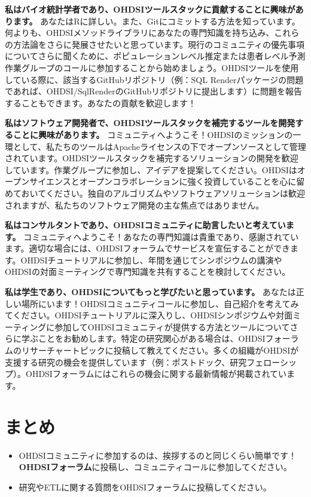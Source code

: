 \documentclass[
  11pt]{book}
\makeatletter
\providecommand{\tightlist}{%
  \setlength{\itemsep}{0pt}\setlength{\parskip}{0pt}}
\newenvironment{kframe}{%
\medskip{}
\setlength{\fboxsep}{.8em}
 \def\at@end@of@kframe{}%
 \ifinner\ifhmode%
  \def\at@end@of@kframe{\end{minipage}}%
  \begin{minipage}{\columnwidth}%
 \fi\fi%
 \def\FrameCommand##1{\hskip\@totalleftmargin \hskip-\fboxsep
 \colorbox{myShadeColor}{##1}\hskip-\fboxsep
     \hskip-\linewidth \hskip-\@totalleftmargin \hskip\columnwidth}%
 \MakeFramed {\advance\hsize-\width
   \@totalleftmargin\z@ \linewidth\hsize
   \@setminipage}}%
 {\par\unskip\endMakeFramed%
 \at@end@of@kframe}
\newenvironment{rmdblock}[1]
  {
  \begin{itemize}
  \renewcommand{\labelitemi}{
    \raisebox{-.7\height}[0pt][0pt]{
      {\setkeys{Gin}{width=3em,keepaspectratio}\texttt{[image: images/\#1]}}
    }
  }
  \setlength{\fboxsep}{1em}
  \begin{kframe}
  \item
  }
  {
  \end{kframe}
  \end{itemize}
  }
\newenvironment{rmdsummary}
  {\begin{rmdblock}{summary}}
  {\end{rmdblock}}
\theoremstyle{definition}
\theoremstyle{definition}
\theoremstyle{definition}
\theoremstyle{definition}
\theoremstyle{remark}
\makeatother
\begin{document}
\textbf{私はバイオ統計学者であり、OHDSIツールスタックに貢献することに興味があります。} あなたはRに詳しい。また、Gitにコミットする方法を知っています。何よりも、OHDSIメソッドライブラリにあなたの専門知識を持ち込み、これらの方法論をさらに発展させたいと思っています。現行のコミュニティの優先事項についてさらに聞くために、ポピュレーションレベル推定または患者レベル予測作業グループのコールに参加することから始めましょう。OHDSIツールを使用している際に、該当するGitHubリポジトリ（例：SQL Renderパッケージの問題であれば、OHDSI/SqlRenderのGitHubリポジトリに提出します）に問題を報告することもできます。あなたの貢献を歓迎します！

\textbf{私はソフトウェア開発者で、OHDSIツールスタックを補完するツールを開発することに興味があります。} コミュニティへようこそ！OHDSIのミッションの一環として、私たちのツールはApacheライセンスの下でオープンソースとして管理されています。OHDSIツールスタックを補完するソリューションの開発を歓迎しています。作業グループに参加し、アイデアを提案してください。OHDSIはオープンサイエンスとオープンコラボレーションに強く投資していることを心に留めておいてください。独自のアルゴリズムやソフトウェアソリューションは歓迎されますが、私たちのソフトウェア開発の主な焦点ではありません。

\textbf{私はコンサルタントであり、OHDSIコミュニティに助言したいと考えています。} コミュニティへようこそ！あなたの専門知識は貴重であり、感謝されています。適切な場合には、OHDSIフォーラムでサービスを宣伝することができます。OHDSIチュートリアルに参加し、年間を通じてシンポジウムの講演やOHDSIの対面ミーティングで専門知識を共有することを検討してください。

\textbf{私は学生であり、OHDSIについてもっと学びたいと思っています。} あなたは正しい場所にいます！OHDSIコミュニティコールに参加し、自己紹介を考えてみてください。OHDSIチュートリアルに深入りし、OHDSIシンポジウムや対面ミーティングに参加してOHDSIコミュニティが提供する方法とツールについてさらに学ぶことをお勧めします。特定の研究関心がある場合は、OHDSIフォーラムのリサーチャートピックに投稿して教えてください。多くの組織がOHDSIが支援する研究の機会を提供しています（例：ポストドック、研究フェローシップ）。OHDSIフォーラムにはこれらの機会に関する最新情報が掲載されています。

\section{まとめ}\label{ux307eux3068ux3081-1}

\begin{rmdsummary}
\begin{itemize}
\tightlist
\item
  OHDSIコミュニティに参加するのは、挨拶するのと同じくらい簡単です！\textbf{OHDSIフォーラム}に投稿し、コミュニティコールに参加してください。
\item
  研究やETLに関する質問をOHDSIフォーラムに投稿してください。
\end{itemize}
\end{rmdsummary}
\end{document}
